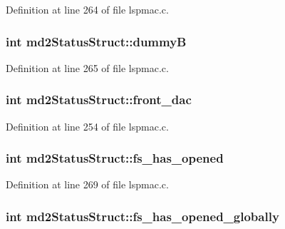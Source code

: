 Definition at line 264 of file lspmac.c.\hypertarget{structmd2StatusStruct_aab597be69a8dcc140778d9aeb8a50eee}{
\subsubsection[{dummyB}]{\setlength{\rightskip}{0pt plus 5cm}int {\bf md2StatusStruct::dummyB}}}
\label{structmd2StatusStruct_aab597be69a8dcc140778d9aeb8a50eee}


Definition at line 265 of file lspmac.c.\hypertarget{structmd2StatusStruct_a3be73c48b09190241a2bcb801af5b97c}{
\subsubsection[{front\_\-dac}]{\setlength{\rightskip}{0pt plus 5cm}int {\bf md2StatusStruct::front\_\-dac}}}
\label{structmd2StatusStruct_a3be73c48b09190241a2bcb801af5b97c}


Definition at line 254 of file lspmac.c.\hypertarget{structmd2StatusStruct_ab961c2ba24a1a8c95a88dec25319e712}{
\subsubsection[{fs\_\-has\_\-opened}]{\setlength{\rightskip}{0pt plus 5cm}int {\bf md2StatusStruct::fs\_\-has\_\-opened}}}
\label{structmd2StatusStruct_ab961c2ba24a1a8c95a88dec25319e712}


Definition at line 269 of file lspmac.c.\hypertarget{structmd2StatusStruct_ac95696b7ed35ccfdfb6aeeee879bdb65}{
\subsubsection[{fs\_\-has\_\-opened\_\-globally}]{\setlength{\rightskip}{0pt plus 5cm}int {\bf md2StatusStruct::fs\_\-has\_\-opened\_\-globally}}}
\label{structmd2StatusStruct_ac95696b7ed35ccfdfb6aeeee879bdb65}


